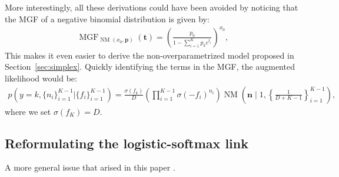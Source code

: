 More interestingly, all these derivations could have been avoided by noticing that the \ac{MGF} of a negative binomial distribution is given by:
\begin{align*}
    \operatorname{MGF}_{\operatorname{NM}(x_0,\boldsymbol{p})}(\boldsymbol{t}) = \left(\frac{p_0}{1-\sum_{i=1}^K p_k e^{t_i}}\right)^{x_0},
\end{align*}
This makes it even easier to derive the non-overparametrized model proposed in Section~\ref{sec:simplex}.
Quickly identifying the terms in the \ac{MGF}, the augmented likelihood would be:
\begin{align*}
    p\left(y=k,\{n_i\}_{i=1}^{K-1}|\{f_i\}_{i=1}^{K-1}\right) = \frac{\sigma(f_k)}{D}\left(\prod_{i=1}^{K-1}\sigma(-f_i)^{n_i}\right)\operatorname{NM}\left(\boldsymbol{n}\mid 1, \left\{\frac{1}{D+K-1}\right\}_{i=1}^{K-1}\right),
\end{align*}
where we set $\sigma(f_K) = D$.

\subsection{Reformulating the logistic-softmax link}

A more general issue that arised in this paper .


